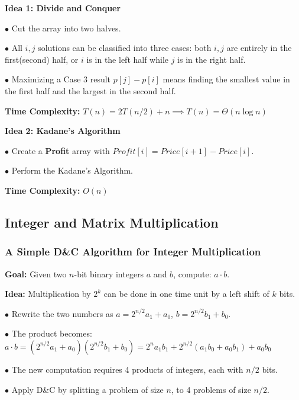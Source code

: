 \documentclass[10pt]{article}
\begin{document}
\textbf{Idea 1: Divide and Conquer}

$\bullet$ Cut the array into two halves.

$\bullet$ All $i, j$ solutions can be classified into three cases: both $i, j$ are entirely in the first(second) half, or $i$ is in the left half while $j$ is in the right half.

$\bullet$ Maximizing a Case 3 result $p[j]-p[i]$ means finding the smallest value in the first half and the largest in the second half.

\textbf{Time Complexity:} $T(n) = 2T(n/2) + n \implies T(n) = \Theta(n\log n)$

\vspace*{1em}

\textbf{Idea 2: Kadane's Algorithm}

$\bullet$ Create a \textbf{Profit} array with $Profit[i]=Price[i+1]-Price[i]$.

$\bullet$ Perform the Kadane's Algorithm.

\textbf{Time Complexity:} $O(n)$

\subsection{Integer and Matrix Multiplication}

\subsubsection{A Simple D\&C Algorithm for Integer Multiplication}

\textbf{Goal:} Given two $n$-bit binary integers $a$ and $b$, compute: $a\cdot b$.

\textbf{Idea:} Multiplication by $2^k$ can be done in one time unit by a left shift of $k$ bits.

$\bullet$ Rewrite the two numbers as $a = 2^{n/2} a_1 + a_0$, $b = 2^{n/2} b_1 + b_0$.

$\bullet$ The product becomes: $a\cdot b = (2^{n/2} a_1 + a_0)(2^{n/2} b_1 + b_0) = 2^n a_1 b_1 + 2^{n/2} (a_1 b_0 + a_0 b_1) + a_0 b_0$

$\bullet$ The new computation requires 4 products of integers, each with $n/2$ bits.

$\bullet$ Apply D\&C by splitting a problem of size $n$, to 4 problems of size $n/2$.
\end{document}
